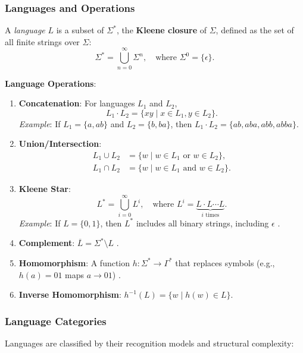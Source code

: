 \subsubsection{Languages and Operations}
A \textit{language} $L$ is a subset of $\Sigma^\ast$, the \textbf{Kleene closure} of $\Sigma$, defined as the set of all finite strings over $\Sigma$:  
\[
\Sigma^\ast = \bigcup_{n=0}^\infty \Sigma^n, \quad \text{where } \Sigma^0 = \{\epsilon\}.
\]\cite{kleene1956representation}

\textbf{Language Operations}:  
\begin{enumerate}
    \item \textbf{Concatenation}: For languages $L_1$ and $L_2$,  
    \[
    L_1 \cdot L_2 = \{xy \mid x \in L_1, y \in L_2\}.
    \]  
    \textit{Example}: If $L_1 = \{a, ab\}$ and $L_2 = \{b, ba\}$, then $L_1 \cdot L_2 = \{ab, aba, abb, abba\}$.\cite{hopcroft2006introduction}

    \item \textbf{Union/Intersection}:  
    \begin{align*}
        L_1 \cup L_2 &= \{w \mid w \in L_1 \text{ or } w \in L_2\}, \\
        L_1 \cap L_2 &= \{w \mid w \in L_1 \text{ and } w \in L_2\}.
    \end{align*}\cite{hopcroft2006introduction}

    \item \textbf{Kleene Star}:  
    \[
    L^\ast = \bigcup_{i=0}^\infty L^i, \quad \text{where } L^i = \underbrace{L \cdot L \cdots L}_{i \text{ times}}.
    \]  
\cite{kleene1956representation}
    \textit{Example}: If $L = \{0, 1\}$, then $L^\ast$ includes all binary strings, including $\epsilon$ \cite{hopcroft2006introduction}.  

    \item \textbf{Complement}: $\overline{L} = \Sigma^\ast \setminus L$ \cite{hopcroft2006introduction}.  
    \item \textbf{Homomorphism}: A function $h: \Sigma^\ast \to \Gamma^\ast$ that replaces symbols (e.g., $h(a) = 01$ maps $a \to 01$) \cite{hopcroft2006introduction}.  
    \item \textbf{Inverse Homomorphism}: $h^{-1}(L) = \{w \mid h(w) \in L\}$.  
    \cite{hopcroft2006introduction}
\end{enumerate}

\subsubsection{Language Categories}
Languages are classified by their recognition models and structural complexity:  

